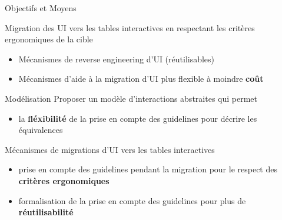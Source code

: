 \documentclass[11pt]{beamer}
\begin{document}
\begin{frame}[t]{Objectifs et Moyens}
\begin{block}{ {\small Migration des UI vers les tables interactives en respectant les critères ergonomiques de la cible}}
\begin{itemize}
	\item {\tiny Mécanismes de reverse engineering d'UI (réutilisables)}
	\item {\tiny Mécanismes d'aide à la migration d'UI plus flexible à moindre \textbf{coût}}
\end{itemize}
\end{block}

\pause
\begin{block}{{\small Modélisation}}
{\tiny Proposer un modèle d'interactions abstraites qui permet}
\begin{itemize}
	\item {\tiny la \textbf{fléxibilité} de la prise en compte des guidelines pour décrire les équivalences}
\end{itemize}
\end{block}
\begin{block}{{\small Mécanismes de migrations d'UI vers les tables interactives}}
	\begin{itemize}
		\item {\tiny prise en compte des guidelines pendant la migration pour le respect des \textbf{critères ergonomiques} }
		\item {\tiny formalisation de la prise en compte des guidelines pour plus de \textbf{réutilisabilité}}
	\end{itemize}
\end{block}

\end{frame}
\end{document}
